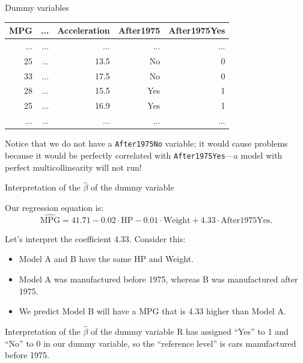 \documentclass{beamer}\usepackage[]{graphicx}\usepackage[]{color}
\begin{document}
\begin{darkframes}
\begin{frame}[fragile]{Dummy variables}
      \begin{table}[!b]
        {\carlitoTLF %
        \begin{tabularx}{\textwidth}{rrrrr}

           MPG &  ... & Acceleration & After1975 & After1975Yes\\
          \toprule
            ... & ... & ... & ... & ... \\
            25 & ... & 13.5 & No & 0 \\
            33 & ... & 17.5 & No & 0 \\
            28 & ... & 15.5 & Yes & 1 \\
            25 & ... & 16.9 & Yes & 1 \\
            ... & ... & ... & ... & ... \\
          \bottomrule

        \end{tabularx}}

      \end{table}

      \pause
      Notice that we do not have a \texttt{After1975No} variable; it would cause problems because it would be perfectly correlated with \texttt{After1975Yes}---a model with perfect multicollinearity will not run!
    \end{frame}

    \begin{frame}[fragile]{Interpretation of the $\hat\beta$ of the dummy variable}
      
      Our regression equation is:
      \[
        \widehat{\text{MPG}} = 41.71 -
        0.02 \cdot \text{HP} -
        0.01 \cdot \text{Weight} +
        4.33 \cdot \text{After1975Yes}.
      \]
      \pause

      Let's interpret the coefficient 4.33.
      Consider this:
      \begin{itemize}[<+->]
        \item Model A and B have the same HP and Weight.
        \item Model A was manufactured before 1975, whereas B was manufactured after 1975.
        \item We predict Model B will have a MPG that is 4.33 higher than Model A.
      \end{itemize}
      \lc
    \end{frame}

    \begin{frame}[fragile]{Interpretation of the $\hat\beta$ of the dummy variable}
      R has assigned ``Yes'' to 1 and ``No'' to 0 in our dummy variable, so the ``reference level'' is cars manufactured before 1975.
      \pause\bigskip


\end{frame}
\end{darkframes}
\end{document}
